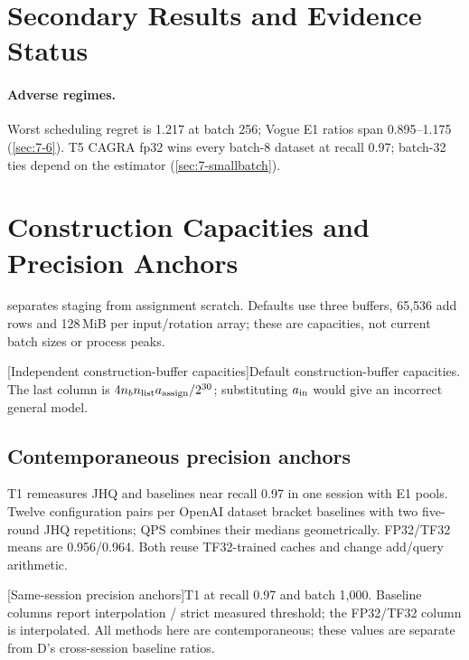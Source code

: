 \section{Secondary Results and Evidence Status}
\label{sec:b-secondary}
\paragraph{Adverse regimes.}
Worst scheduling regret is 1.217 at batch 256; Vogue E1 ratios span 0.895--1.175 (\cref{sec:7-6}). T5 CAGRA fp32 wins every batch-8 dataset at recall 0.97; batch-32 ties depend on the estimator (\cref{sec:7-smallbatch}).





\section{Construction Capacities and Precision Anchors}
\label{sec:b-full-review}

 separates staging from assignment scratch. Defaults use three buffers, 65,536 add rows and 128\,MiB per input/rotation array; these are capacities, not current batch sizes or process peaks.

\par\medskip\noindent\begin{minipage}{\linewidth}
\centering\captionsetup{hypcap=false}
[Independent construction-buffer capacities]{Default construction-buffer capacities.
The last column is $4n_b n_{\rm list}a_{\rm assign}/2^{30}$; substituting
$a_{\rm in}$ would give an incorrect general model.}
\label{tab:b-scratch}
\footnotesize
\end{minipage}\par\medskip

\subsection{Contemporaneous precision anchors}
\label{sec:b-precision-anchors}

T1 remeasures JHQ and baselines near recall 0.97 in one session with E1 pools. Twelve configuration pairs per OpenAI dataset bracket baselines with two five-round JHQ repetitions; QPS combines their medians geometrically. FP32/TF32 means are 0.956/0.964. Both reuse TF32-trained caches and change add/query arithmetic.

\par\medskip\noindent\begin{minipage}{\linewidth}
\centering\captionsetup{hypcap=false}
[Same-session precision anchors]{T1 at recall 0.97 and batch 1,000.
Baseline columns report interpolation / strict measured threshold;
the FP32/TF32 column is interpolated. All methods here are contemporaneous;
these values are separate from D's cross-session baseline ratios.}
\label{tab:b-precision-anchors}
\footnotesize\setlength{\tabcolsep}{3pt}

\end{minipage}\par\medskip

